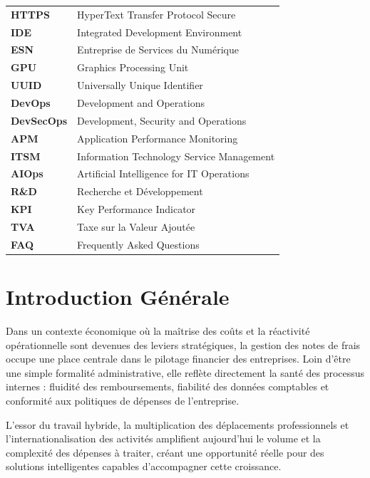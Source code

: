 \documentclass[12pt,a4paper]{report}
\let\oldchapter\chapter
\def\chapter{\clearpage\setcounter{section}{0}\oldchapter}
\begin{document}
\begin{longtable}{ll}
\textbf{HTTPS} & HyperText Transfer Protocol Secure \\
\textbf{IDE} & Integrated Development Environment \\
\textbf{ESN} & Entreprise de Services du Numérique \\
\textbf{GPU} & Graphics Processing Unit \\
\textbf{UUID} & Universally Unique Identifier \\
\textbf{DevOps} & Development and Operations \\
\textbf{DevSecOps} & Development, Security and Operations \\
\textbf{APM} & Application Performance Monitoring \\
\textbf{ITSM} & Information Technology Service Management \\
\textbf{AIOps} & Artificial Intelligence for IT Operations \\
\textbf{R\&D} & Recherche et Développement \\
\textbf{KPI} & Key Performance Indicator \\
\textbf{TVA} & Taxe sur la Valeur Ajoutée \\
\textbf{FAQ} & Frequently Asked Questions \\
\end{longtable}
\clearpage


\setcounter{page}{1}

\chapter*{Introduction Générale}



Dans un contexte économique où la maîtrise des coûts et la réactivité opérationnelle sont devenues des leviers stratégiques, la gestion des notes de frais occupe une place centrale dans le pilotage financier des entreprises. Loin d'être une simple formalité administrative, elle reflète directement la santé des processus internes : fluidité des remboursements, fiabilité des données comptables et conformité aux politiques de dépenses de l'entreprise.



L'essor du travail hybride, la multiplication des déplacements professionnels et l'internationalisation des activités amplifient aujourd'hui le volume et la complexité des dépenses à traiter, créant une opportunité réelle pour des solutions intelligentes capables d'accompagner cette croissance.
\end{document}
